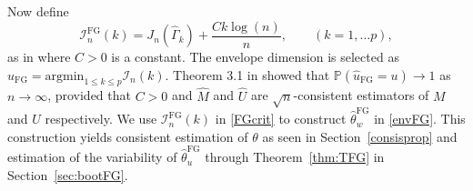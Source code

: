 \documentclass{article}\usepackage[]{graphicx}\usepackage[]{color}
\newcommand{\Prob}{\mathbb{P}}
\newcommand{\tr}{\text{tr}}
\newcommand{\Mhat}{\widehat{M}}
\newcommand{\Uhat}{\widehat{U}}
\newcommand{\TFG}{\widehat{\theta}^{\text{FG}}}
\newcommand{\Ttil}{\widetilde{\theta}}
\newcommand{\Gamhat}{\widehat{\Gamma}}
\newcommand{\rootn}{\sqrt{n}}
\newcommand{\EnvwFG}{\widehat{\theta}^{\text{FG}}_w}
\newcommand{\IFG}{\mathcal{I}_n^{\text{FG}}}
\newcommand{\In}{\mathcal{I}_n}
\newcommand{\uFG}{\hat{u}_{\text{FG}}}
\newcommand{\X}{\mathbf{X}}
\newcommand{\A}{\mathcal{A}}
\begin{document}
Now define
\begin{equation} \label{FGcrit}
  \IFG(k) = J_n(\Gamhat_k) + \frac{Ck\log(n)}{n}, \qquad (k = 1,\ldots p), 
\end{equation}
as in \cite{zhangmai} where $C > 0$ is a constant. %
The envelope dimension is selected as $\uFG = \text{argmin}_{1\leq k\leq p} \In(k)$. Theorem 3.1 in \citet{zhangmai} showed that $\Prob(\uFG = u) \to 1$ as $n \to \infty$, provided that $C > 0$ and $\Mhat$ and $\Uhat$ are $\rootn$-consistent estimators of $M$ and $U$ respectively. We use $\IFG(k)$ in \eqref{FGcrit} to construct $\EnvwFG$ in \eqref{envFG}. This construction yields consistent estimation of $\theta$ as seen in Section~\ref{consisprop} and %
estimation of the variability of $\TFG_u$ through Theorem~\ref{thm:TFG} %
in Section~\ref{sec:bootFG}. %
\end{document}
